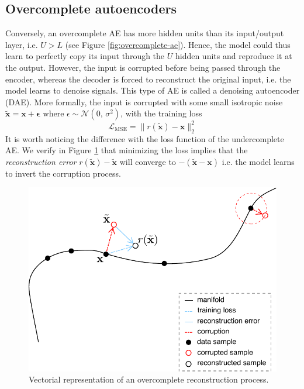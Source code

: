 \subsection*{Overcomplete autoencoders}\label{sec:overcomplete}
Conversely, an overcomplete AE has more hidden units than its input/output layer, i.e. $U > L$ (see Figure \ref{fig:overcomplete-ae}). Hence, the model could thus learn to perfectly copy its input through the $U$ hidden units and reproduce it at the output. However, the input is corrupted before being passed through the encoder, whereas the decoder is forced to reconstruct the original input, i.e. the model learns to denoise signals. This type of AE is called a denoising autoencoder (DAE). More formally, the input is corrupted with some small isotropic noise $\tilde{\mathbf{x}} = \mathbf{x} + \mathbf{\epsilon}$ where $\epsilon \sim \mathcal{N}(0,\,\sigma^{2})$, with the training loss 
\begin{equation}
\mathcal{L}_{\text{MSE}} = \lVert r(\tilde{\mathbf{x}}) - \mathbf{x} \rVert_2^2
\end{equation}
It is worth noticing the difference with the loss function of the undercomplete AE. We verify in Figure \ref{fig:reconstruction-dae} that minimizing the loss implies that the \textit{reconstruction error} $r(\tilde{\mathbf{x}}) - \tilde{\mathbf{x}}$ will converge to $-(\tilde{\mathbf{x}} - \mathbf{x})$ i.e. the model learns to invert the corruption process.

\begin{figure}[!h]
\centering
\includegraphics[scale=0.55]{figures/reconstruction-denoising}
\caption[Vectorial representation of overcomplete AE]{Vectorial representation of an overcomplete reconstruction process.}
\label{fig:reconstruction-dae}
\end{figure}

